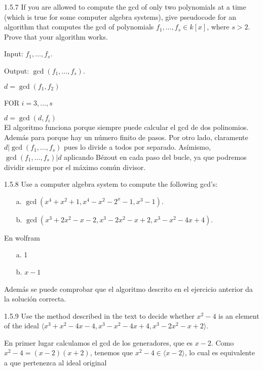 \documentclass[twoside]{article}
\begin{document}
\newpage

\begin{ejercicio}{1.5.7}
If you are allowed to compute the gcd of only two polynomials at a time (which is true
for some computer algebra systems), give pseudocode for an algorithm that computes
the gcd of polynomials $f_1,\dots, f_s ∈ k[x]$, where $s > 2$. Prove that your algorithm works.
\end{ejercicio}
\begin{solucion}
Input: $f_1,\dots, f_s$.

Output: $\gcd(f_1,\dots, f_s)$.

$d=\gcd(f_1,f_2)$

FOR $i=3,\dots, s$

$d=\gcd(d,f_i)$\\

El algoritmo funciona porque siempre puede calcular el gcd de dos polinomios. Además para porque hay un número finito de pasos. Por otro lado, claramente $d |\gcd(f_1,\dots, f_s)$ pues lo divide a todos por separado. Asímismo, $\gcd(f_1,\dots, f_s)|d$ aplicando Bézout en cada paso del bucle, ya que podremos dividir siempre por el máximo común divisor. 


\end{solucion}

\newpage

\begin{ejercicio}{1.5.8}
Use a computer algebra system to compute the following gcd’s:
\begin{itemize}
\item[a.] $\gcd(x^4 + x^2 + 1, x^4 − x^2 − 2^x − 1, x^3 − 1)$.
\item[b.] $\gcd(x^3 + 2x^2 − x − 2, x^3 − 2x^2 − x + 2, x^3 − x^2 − 4x + 4)$.
\end{itemize}
\end{ejercicio}

\begin{solucion}
En wolfram
\begin{itemize}
\item[a.] 1
\item[b.]$x-1$
\end{itemize}
Además se puede comprobar que el algoritmo descrito en el ejercicio anterior da la solución correcta.
\end{solucion}
\newpage
\begin{ejercicio}{1.5.9}
Use the method described in the text to decide whether $x^2 − 4$ is an element of the ideal
$\langle x^3 + x^2 − 4x − 4, x^3 − x^2 − 4x + 4, x^3 − 2x^2 − x + 2\rangle$.
\end{ejercicio}
\begin{solucion}
En primer lugar calculamos el gcd de los generadores, que es $x-2$. Como $x^2-4=(x-2)(x+2)$, tenemos que $x^2-4\in \langle x-2\rangle$, lo cual es equivalente a que pertenezca al ideal original
\end{solucion}
\end{document}
